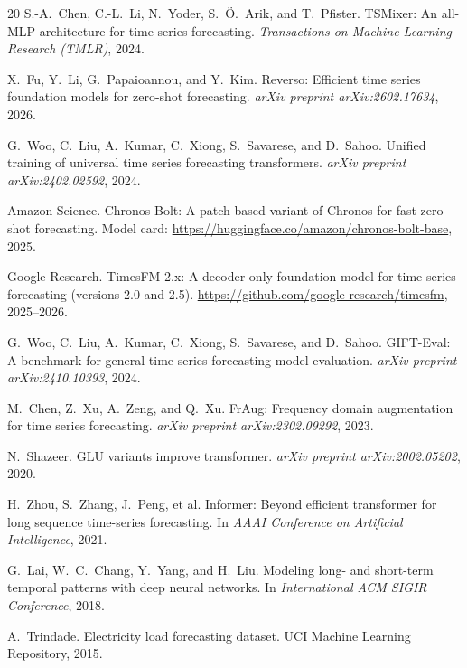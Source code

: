 \documentclass[11pt]{article}
\begin{document}
\begin{thebibliography}{20}
S.-A.~Chen, C.-L.~Li, N.~Yoder, S.~{\"O}.~Arik, and T.~Pfister.
\newblock TSMixer: An all-MLP architecture for time series forecasting.
\newblock \emph{Transactions on Machine Learning Research (TMLR)}, 2024.

X.~Fu, Y.~Li, G.~Papaioannou, and Y.~Kim.
\newblock Reverso: Efficient time series foundation models for zero-shot forecasting.
\newblock \emph{arXiv preprint arXiv:2602.17634}, 2026.

G.~Woo, C.~Liu, A.~Kumar, C.~Xiong, S.~Savarese, and D.~Sahoo.
\newblock Unified training of universal time series forecasting transformers.
\newblock \emph{arXiv preprint arXiv:2402.02592}, 2024.

Amazon Science.
\newblock Chronos-Bolt: A patch-based variant of Chronos for fast zero-shot forecasting.
\newblock Model card: \url{https://huggingface.co/amazon/chronos-bolt-base}, 2025.

Google Research.
\newblock TimesFM 2.x: A decoder-only foundation model for time-series forecasting (versions 2.0 and 2.5).
\newblock \url{https://github.com/google-research/timesfm}, 2025--2026.

G.~Woo, C.~Liu, A.~Kumar, C.~Xiong, S.~Savarese, and D.~Sahoo.
\newblock GIFT-Eval: A benchmark for general time series forecasting model evaluation.
\newblock \emph{arXiv preprint arXiv:2410.10393}, 2024.

M.~Chen, Z.~Xu, A.~Zeng, and Q.~Xu.
\newblock FrAug: Frequency domain augmentation for time series forecasting.
\newblock \emph{arXiv preprint arXiv:2302.09292}, 2023.

N.~Shazeer.
\newblock GLU variants improve transformer.
\newblock \emph{arXiv preprint arXiv:2002.05202}, 2020.

H.~Zhou, S.~Zhang, J.~Peng, et al.
\newblock Informer: Beyond efficient transformer for long sequence time-series forecasting.
\newblock In \emph{AAAI Conference on Artificial Intelligence}, 2021.

G.~Lai, W.~C.~Chang, Y.~Yang, and H.~Liu.
\newblock Modeling long- and short-term temporal patterns with deep neural networks.
\newblock In \emph{International ACM SIGIR Conference}, 2018.

A.~Trindade.
\newblock Electricity load forecasting dataset.
\newblock UCI Machine Learning Repository, 2015.


\end{thebibliography}
\end{document}
